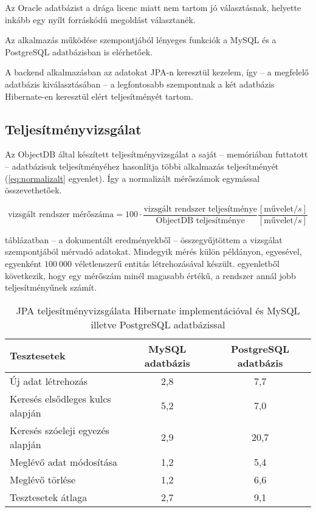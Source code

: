 Az Oracle adatbázist a drága licenc miatt nem tartom jó választásnak, helyette inkább egy nyílt forráskódú megoldást választanék.

Az alkalmazás működése szempontjából lényeges funkciók a MySQL és a PostgreSQL adatbázisban is elérhetőek.

A backend alkalmazásban az adatokat JPA-n keresztül kezelem, így --  a megfelelő adatbázis kiválasztásában --   a legfontosabb szempontnak a két adatbázis Hibernate-en keresztül elért teljesítményét tartom.

\subsection{Teljesítményvizsgálat}
Az ObjectDB által készített teljesítményvizsgálat\cite{JPA_benchmark} a saját --  memóriában futtatott --   adatbázisuk teljesítményéhez hasonlítja többi alkalmazás teljesítményét (\ref{eq:normalizalt} egyenlet). Így a normalizált mérőszámok egymással összevethetőek.

\begin{equation}
\textrm{vizsgált rendszer mérőszáma} = 100 \cdot
\frac{\textrm{vizsgált rendszer teljesítménye}}{\textrm{ObjectDB teljesítménye}}
\frac{[\textrm{művelet}/s]}{[\textrm{művelet}/s]}
\label{eq:normalizalt}
\end{equation}

 táblázatban --  a dokumentált eredményekből\cite{JPA_benchmark} --   összegyűjtöttem a vizsgálat szempontjából mérvadó adatokat. Mindegyik mérés külön példányon, egyesével, egyenként $100~000$ véletlenszerű entitás létrehozásával készült.  egyenletből következik, hogy egy mérőszám minél magasabb értékű, a rendszer annál jobb teljesítményűnek számít.

\begin{table}[hbt]
	
	\begin{tabular}{lc|c}
		Tesztesetek & MySQL adatbázis & PostgreSQL adatbázis \\\hline 
		
		Új adat létrehozás & 2,8 & 7,7\\ \hline
		Keresés elsődleges kulcs alapján  & 5,2 & 7,0\\ \hline
		Keresés szóeleji egyezés alapján & 2,9 & 20,7\\ \hline
		Meglévő adat módosítása & 1,2 & 5,4\\ \hline
		Meglévő törlése & 1,2 & 6,6 \\ \hline
		Tesztesetek átlaga & 2,7 & 9,1
	\end{tabular} 
	
	\caption{JPA teljesítményvizsgálata Hibernate implementációval és  MySQL illetve PostgreSQL adatbázissal }
	\label{tabl:teljesitmenyvizsgalat}
\end{table}

